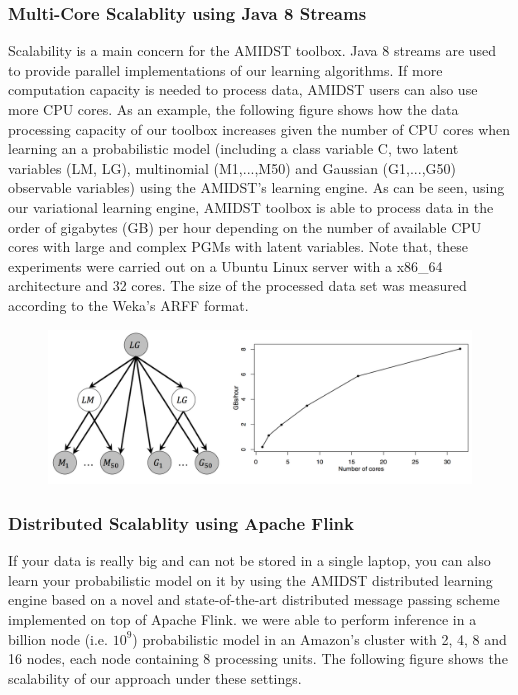 \documentclass[10pt,a4paper]{article}
\begin{document}
\subsubsection{Multi-Core Scalablity using Java 8 Streams}
Scalability is a main concern for the AMIDST toolbox. Java 8 streams are used to provide parallel implementations of our learning algorithms. If more computation capacity is needed to process data, AMIDST users can also use more CPU cores. As an example, the following figure shows how the data processing capacity of our toolbox increases given the number of CPU cores when learning an a probabilistic model (including a class variable C, two latent variables (LM, LG), multinomial (M1,...,M50) and Gaussian (G1,...,G50) observable variables) using the AMIDST's learning engine. As can be seen, using our variational learning engine, AMIDST toolbox is able to process data in the order of gigabytes (GB) per hour depending on the number of available CPU cores with large and complex PGMs with latent variables. Note that, these experiments were carried out on a Ubuntu Linux server with a x86\_64 architecture and 32 cores. The size of the processed data set was measured according to the Weka's ARFF format.


\begin{figure}[h!]
	\centering
	\includegraphics[width=15cm]{img/multicore_res.png}
\end{figure}


\subsubsection{Distributed Scalablity using Apache Flink}
If your data is really big and can not be stored in a single laptop, you can also learn your probabilistic model on it by using the AMIDST distributed learning engine based on a novel and state-of-the-art distributed message passing scheme implemented on top of Apache Flink. we were able to perform inference in a billion node (i.e. $10^9$) probabilistic model in an Amazon's cluster with 2, 4, 8 and 16 nodes, each node containing 8 processing units. The following figure shows the scalability of our approach under these settings.
\end{document}

